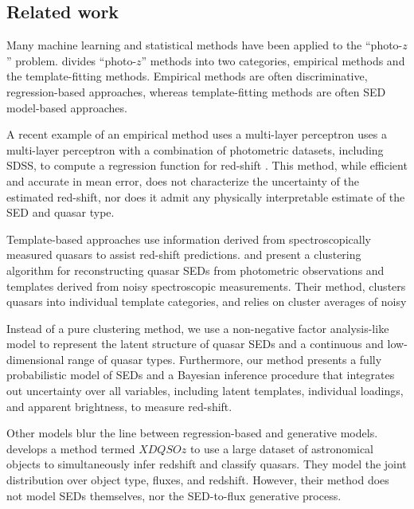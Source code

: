 \documentclass{article}
\begin{document}
\subsection{Related work}
Many machine learning and statistical methods have been applied to the ``photo-$z$'' problem. 
\citet{walcher2011fitting} divides ``photo-$z$'' methods into two categories, empirical methods and the template-fitting methods.  Empirical methods are often discriminative, regression-based approaches, whereas template-fitting methods are often SED model-based approaches.  

A recent example of an empirical method uses a multi-layer perceptron uses a multi-layer perceptron with a combination of photometric datasets, including SDSS, 
to compute a regression function for red-shift \cite{brescia2013photometric}. 
This method, while efficient and accurate in mean error, does not characterize the uncertainty of the estimated red-shift, nor does it admit any physically interpretable estimate of the SED and quasar type.  

Template-based approaches use information derived from spectroscopically measured quasars to assist red-shift predictions.  
\citet{budavari2001photometric} and \citet{richards2001photometric} present a clustering algorithm for reconstructing quasar SEDs from photometric observations and templates derived from noisy spectroscopic measurements.  
Their method, clusters quasars into individual template categories, and relies on cluster averages of noisy 

Instead of a pure clustering method, we use a non-negative factor analysis-like model to represent the latent structure of quasar SEDs and a continuous and low-dimensional range of quasar types.  
Furthermore, our method presents a fully probabilistic model of SEDs and a Bayesian inference procedure that integrates out uncertainty over all variables, including  latent templates, individual loadings, and apparent brightness, to measure red-shift.    

Other models blur the line between regression-based and generative models.  \citet{bovy2012photometric} develops a method termed $XDQSOz$ to use a large dataset of astronomical objects to simultaneously infer redshift and classify quasars.  
They model the joint distribution over object type, fluxes, and redshift.  However, their method does not model SEDs themselves, nor the SED-to-flux generative process. 
\end{document}
